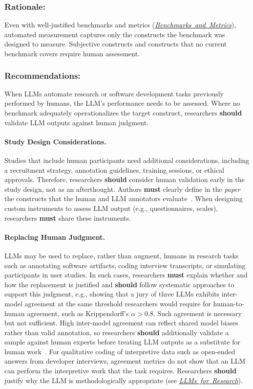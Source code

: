 \documentclass[smallextended]{svjour3}
\newcommand{\must}{\textbf{must}\xspace}
\newcommand{\should}{\textbf{should}\xspace}
\newcommand{\paper}{\emph{paper}\xspace}
\newcommand{\paper}{\emph{paper}\xspace}
\newcommand{\llmsforresearcher}{\hyperref[sec:llms-as-tools-for-software-engineering-researchers]{\mbox{\emph{LLMs for Research}}}\xspace}
\newcommand{\llmsforresearcher}{\href{/study-types/llms-for-research/}{\emph{LLMs for Research}}\xspace}
\newcommand{\benchmarksmetrics}{\hyperref[sec:use-suitable-baselines-benchmarks-and-metrics]{\mbox{\emph{Benchmarks and Metrics}}}\xspace}
\newcommand{\benchmarksmetrics}{\href{/guidelines/benchmarks-metrics/}{\emph{Benchmarks and Metrics}}\xspace}
\newcommand{\guidelinesubsubsection}[1]{\subsubsection{\bfseries #1:}}
\newcommand{\guidelineparagraph}[1]{\paragraph{#1.}}
\newcommand{\guidelinesubsubsection}[1]{\subsubsection{#1}}
\newcommand{\guidelineparagraph}[1]{\paragraph{#1}}
\begin{document}
\guidelinesubsubsection{Rationale}

Even with well-justified benchmarks and metrics (\benchmarksmetrics), automated measurement captures only the constructs the benchmark was designed to measure.
Subjective constructs and constructs that no current benchmark covers require human assessment.

\guidelinesubsubsection{Recommendations}

When LLMs automate research or software development tasks previously performed by humans, the LLM's performance needs to be assessed.
Where no benchmark adequately operationalizes the target construct, researchers \should validate LLM outputs against human judgment.

\guidelineparagraph{Study Design Considerations}
Studies that include human participants need additional considerations, including a recruitment strategy, annotation guidelines, training sessions, or ethical approvals.
Therefore, researchers \should consider human validation early in the study design, not as an afterthought.
Authors \must clearly define in the \paper the constructs that the human and LLM annotators evaluate~\cite{DBLP:conf/ease/RalphT18}.
When designing custom instruments to assess LLM output (e.g., questionnaires, scales), researchers \must share these instruments.

\guidelineparagraph{Replacing Human Judgment}
LLMs may be used to replace, rather than augment, humans in research tasks such as annotating software artifacts, coding interview transcripts, or simulating participants in user studies. In such cases, researchers \must explain whether and how the replacement is justified and \should follow systematic approaches to support this judgment, e.g., showing that a jury of three LLMs exhibits inter-model agreement at the same threshold researchers would require for human-to-human agreement, such as Krippendorff's $\alpha>0.8$. Such agreement is necessary but not sufficient. High inter-model agreement can reflect shared model biases rather than valid annotation, so researchers \should additionally validate a sample against human experts before treating LLM outputs as a substitute for human work~\cite{DBLP:conf/msr/AhmedDTP25, Krippendorff2018}. For qualitative coding of interpretive data such as open-ended answers from developer interviews, agreement metrics do not show that an LLM can perform the interpretive work that the task requires. Researchers \should justify why the LLM is methodologically appropriate (see \llmsforresearcher).
\end{document}
